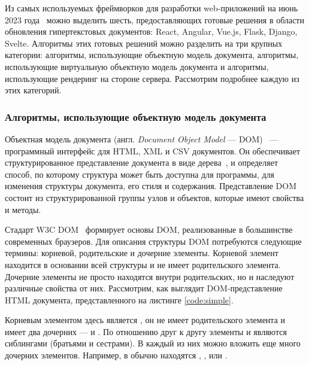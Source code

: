 Из самых используемых фреймворков для разработки web-приложений на июнь 2023 года~\cite{web-frameworks-statistics} можно выделить шесть, предоставляющих готовые решения в области обновления гипертекстовых документов: React, Angular, Vue.js, Flask, Django, Svelte. 
Алгоритмы этих готовых решений можно разделить на три крупных категории: алгоритмы, использующие объектную модель документа, алгоритмы, использующие виртуальную объектную модель документа и алгоритмы, использующие рендеринг на стороне сервера. 
Рассмотрим подробнее каждую из этих категорий.

\subsubsection{Алгоритмы, использующие объектную модель  документа}

Объектная модель документа (англ. \textit{Document Object Model} --- DOM)~\cite{dom} --- программный интерфейс для HTML, XML и CSV документов.
Он обеспечивает структурированное представление документа в виде дерева~\cite{balanced-tree}, и определяет способ, по которому структура может быть доступна для программы, для изменения структуры документа, его стиля и содержания.
Представление DOM состоит из структурированной группы узлов и объектов, которые имеют свойства и методы.

Стадарт W3C DOM~\cite{dom-doc} формирует основы DOM, реализованные в большинстве современных браузеров.
Для описания структуры DOM потребуются следующие термины: корневой, родительские и дочерние элементы.
Корневой элемент находится в основании всей структуры и не имеет родительского элемента.
Дочерние элементы не просто находятся внутри родительских, но и наследуют различные свойства от них.
Рассмотрим, как выглядит DOM-представление HTML документа, представленного на листинге \ref{code:simple}.
\clearpage


Корневым элементом здесь является , он не имеет родительского элемента и имеет два дочерних ---  и . По отношению друг к другу элементы  и  являются сиблингами (братьями и сестрами). В каждый из них можно вложить еще много дочерних элементов. Например, в  обычно находятся , ,  или .

